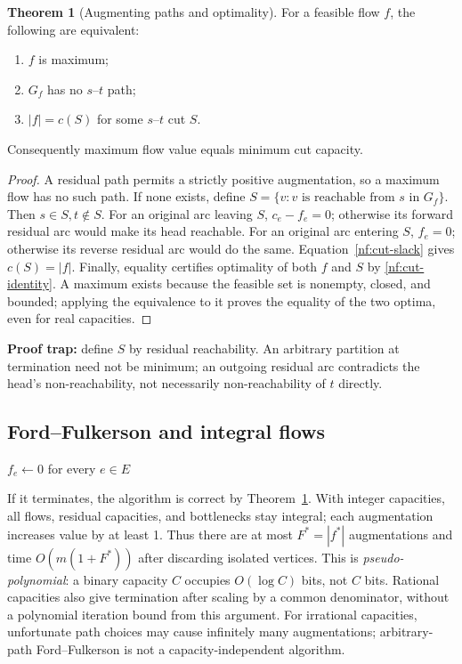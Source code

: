 \documentclass[10pt]{article}
\theoremstyle{definition}
\newtheorem{theorem}[definition]{Theorem}
\begin{document}
\begin{theorem}[Augmenting paths and optimality]\label{nf:mfmc}
For a feasible flow $f$, the following are equivalent:
\begin{enumerate}
 \item $f$ is maximum;
 \item $G_f$ has no $s$--$t$ path;
 \item $|f|=c(S)$ for some $s$--$t$ cut $S$.
\end{enumerate}
Consequently maximum flow value equals minimum cut capacity.
\end{theorem}
\begin{proof}
A residual path permits a strictly positive augmentation, so a maximum flow
has no such path. If none exists, define
$S=\{v:v\text{ is reachable from }s\text{ in }G_f\}$.
Then $s\in S,t\notin S$. For an original arc leaving $S$, $c_e-f_e=0$;
otherwise its forward residual arc would make its head reachable.
For an original arc entering $S$, $f_e=0$; otherwise its reverse residual arc
would do the same. Equation~\eqref{nf:cut-slack} gives $c(S)=|f|$.
Finally, equality certifies optimality of both $f$ and $S$ by
\eqref{nf:cut-identity}. A maximum exists because the feasible set is nonempty,
closed, and bounded; applying the equivalence to it proves the equality of
the two optima, even for real capacities.
\end{proof}
\textbf{Proof trap:} define $S$ by residual reachability. An arbitrary partition
at termination need not be minimum; an outgoing residual arc contradicts the
head's non-reachability, not necessarily non-reachability of $t$ directly.

\subsection{Ford--Fulkerson and integral flows}\label{nf:ff}
\begin{algorithm}[H]
\caption{Ford--Fulkerson: arbitrary residual augmenting paths}
$f_e\gets0$ for every $e\in E$\;
\;
\end{algorithm}
If it terminates, the algorithm is correct by Theorem~\ref{nf:mfmc}.
With integer capacities, all flows, residual capacities, and bottlenecks stay
integral; each augmentation increases value by at least 1. Thus there are at
most $F^*=|f^*|$ augmentations and time $O(m(1+F^*))$ after discarding isolated
vertices. This is \emph{pseudo-polynomial}: a binary capacity $C$ occupies
$O(\log C)$ bits, not $C$ bits. Rational capacities also give termination after
scaling by a common denominator, without a polynomial iteration bound from
this argument. For irrational capacities, unfortunate path choices may cause
infinitely many augmentations; arbitrary-path Ford--Fulkerson is not a
capacity-independent algorithm.
\end{document}
